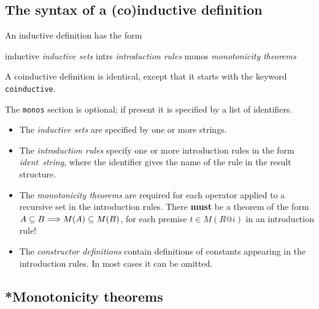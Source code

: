 \subsection{The syntax of a (co)inductive definition}
An inductive definition has the form
\begin{ttbox}
inductive    {\it inductive sets}
  intrs      {\it introduction rules}
  monos      {\it monotonicity theorems}
\end{ttbox}
A coinductive definition is identical, except that it starts with the keyword
\texttt{coinductive}.  

The \texttt{monos} section is optional; if present it is specified by a list
of identifiers.

\begin{itemize}
\item The \textit{inductive sets} are specified by one or more strings.

\item The \textit{introduction rules} specify one or more introduction rules in
  the form \textit{ident\/}~\textit{string}, where the identifier gives the name of
  the rule in the result structure.

\item The \textit{monotonicity theorems} are required for each operator
  applied to a recursive set in the introduction rules.  There {\bf must}
  be a theorem of the form $A\subseteq B\Longrightarrow M(A)\subseteq M(B)$, for each
  premise $t\in M(R@i)$ in an introduction rule!

\item The \textit{constructor definitions} contain definitions of constants
  appearing in the introduction rules.  In most cases it can be omitted.
\end{itemize}


\subsection{*Monotonicity theorems}

